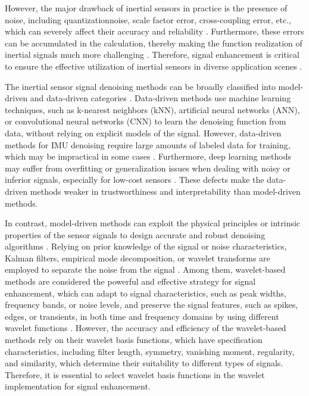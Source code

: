 \documentclass[letterpaper]{article}
\begin{document}
However, the major drawback of inertial sensors in practice is the presence of noise, including quantizationnoise, scale factor error, cross-coupling error, etc., which can severely affect their accuracy and reliability \cite{chen2020deep}.
Furthermore, these errors can be accumulated in the calculation, thereby making the function realization of inertial signals much more challenging \cite{10080916, saha2022tinyodom, saha2023inertial}.
Therefore, signal enhancement is critical to ensure the effective utilization of inertial sensors in diverse application scenes \cite{caesar2020nuscenes}.

The inertial sensor signal denoising methods can be broadly classified into model-driven and data-driven categories \cite{golestani2020human}. Data-driven methods use machine learning techniques, such as k-nearest neighbors (kNN), artificial neural networks (ANN), or convolutional neural networks (CNN) \cite{engelsman2023data} to learn the denoising function from data, without relying on explicit models of the signal.
However, data-driven methods for IMU denoising require large amounts of labeled data for training, which may be impractical in some cases \cite{herath2020ronin}. Furthermore, deep learning methods may suffer from overfitting or generalization issues when dealing with noisy or inferior signals, especially for low-cost sensors \cite{yuan2023simple}. These defects make the data-driven methods weaker in trustworthiness and interpretability than model-driven methods.

In contrast, model-driven methods can exploit the physical principles or intrinsic properties of the sensor signals \cite{9119813} to design accurate and robust denoising algorithms \cite{min2021drop}. Relying on prior knowledge of the signal or noise characteristics, Kalman filters, empirical mode decomposition, or wavelet transforms are employed to separate the noise from the signal \cite{liu2020denoising,he2019noise}. Among them, wavelet-based methods are considered the powerful and effective strategy for signal enhancement, which can adapt to signal characteristics, such as peak widths, frequency bands, or noise levels, and preserve the signal features, such as spikes, edges, or transients, in both time and frequency domains by using different wavelet functions \cite{saydjari2022equivariant}. However, the accuracy and efficiency of the wavelet-based methods rely on their wavelet basis functions, which have specification characteristics, including filter length, symmetry, vanishing moment, regularity, and similarity, which determine their suitability to different types of signals. Therefore, it is essential to select wavelet basis functions in the wavelet implementation for signal enhancement.
\end{document}
